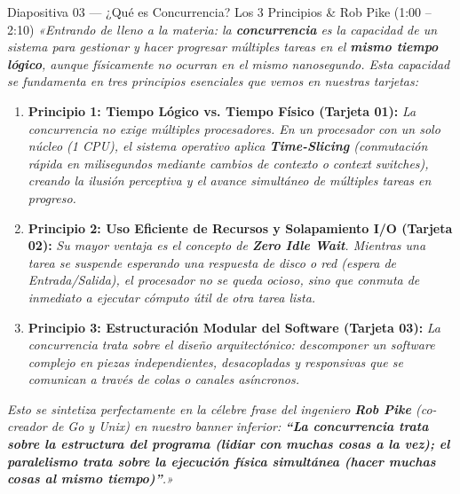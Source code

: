 \documentclass[11pt,a4paper]{article}
\begin{document}
\begin{guionbox}{Diapositiva 03 --- ¿Qué es Concurrencia? Los 3 Principios \& Rob Pike (1:00 -- 2:10)}
\textit{«Entrando de lleno a la materia: la \textbf{concurrencia} es la capacidad de un sistema para gestionar y hacer progresar múltiples tareas en el \textbf{mismo tiempo lógico}, aunque físicamente no ocurran en el mismo nanosegundo. Esta capacidad se fundamenta en tres principios esenciales que vemos en nuestras tarjetas:}

\begin{enumerate}[leftmargin=5mm]
    \item \textbf{Principio 1: Tiempo Lógico vs. Tiempo Físico (Tarjeta 01):} \textit{La concurrencia no exige múltiples procesadores. En un procesador con un solo núcleo (1 CPU), el sistema operativo aplica \textbf{Time-Slicing} (conmutación rápida en milisegundos mediante cambios de contexto o \textit{context switches}), creando la ilusión perceptiva y el avance simultáneo de múltiples tareas en progreso.}
    \item \textbf{Principio 2: Uso Eficiente de Recursos y Solapamiento I/O (Tarjeta 02):} \textit{Su mayor ventaja es el concepto de \textbf{Zero Idle Wait}. Mientras una tarea se suspende esperando una respuesta de disco o red (espera de Entrada/Salida), el procesador no se queda ocioso, sino que conmuta de inmediato a ejecutar cómputo útil de otra tarea lista.}
    \item \textbf{Principio 3: Estructuración Modular del Software (Tarjeta 03):} \textit{La concurrencia trata sobre el diseño arquitectónico: descomponer un software complejo en piezas independientes, desacopladas y responsivas que se comunican a través de colas o canales asíncronos.}
\end{enumerate}

\textit{Esto se sintetiza perfectamente en la célebre frase del ingeniero \textbf{Rob Pike} (co-creador de Go y Unix) en nuestro banner inferior: \textbf{“La concurrencia trata sobre la estructura del programa (lidiar con muchas cosas a la vez); el paralelismo trata sobre la ejecución física simultánea (hacer muchas cosas al mismo tiempo)”}.»}
\end{guionbox}
\end{document}
